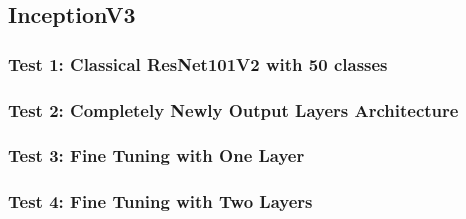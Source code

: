 \subsection{InceptionV3}

\subsubsection{Test 1: Classical ResNet101V2 with 50 classes}

\subsubsection{Test 2: Completely Newly Output Layers Architecture}

\subsubsection{Test 3: Fine Tuning with One Layer}

\subsubsection{Test 4: Fine Tuning with Two Layers}
